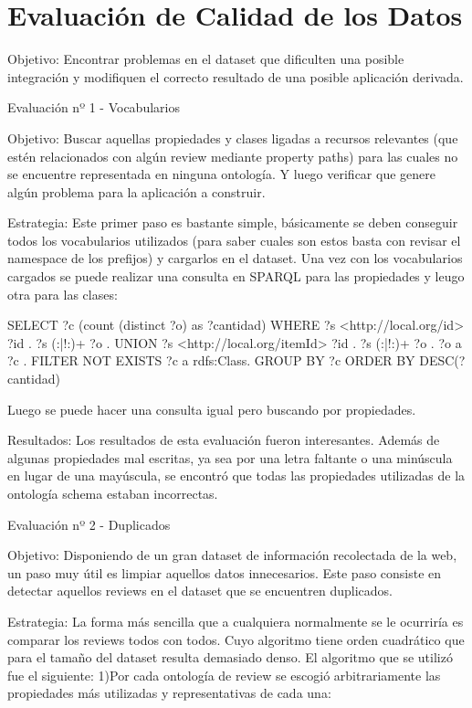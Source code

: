 \chapter{Evaluación de Calidad de los Datos}
\label{chapter:evaluacion}

Objetivo:
Encontrar problemas en el dataset que dificulten una posible integración y modifiquen el correcto resultado de una posible aplicación derivada.

Evaluación nº 1 - Vocabularios

Objetivo:
Buscar aquellas propiedades y clases ligadas a recursos relevantes (que estén relacionados con algún review mediante property paths) 
para las cuales no se encuentre representada en ninguna ontología. Y luego verificar que genere algún problema para la aplicación a construir.

Estrategia:
Este primer paso es bastante simple, básicamente se deben conseguir todos los vocabularios utilizados (para saber cuales son estos basta con revisar el namespace 
de los prefijos) y cargarlos en el dataset.
Una vez con los vocabularios cargados se puede realizar una consulta en SPARQL para las propiedades y leugo otra para las clases:

SELECT ?c (count (distinct ?o) as ?cantidad)
WHERE{
{
?s <http://local.org/id> ?id .
?s (:|!:)+ ?o .
}UNION{
?s <http://local.org/itemId> ?id .
?s (:|!:)+ ?o .
}
?o a ?c .
FILTER NOT EXISTS{
?c a rdfs:Class.
}
}GROUP BY ?c ORDER BY DESC(?cantidad)

Luego se puede hacer una consulta igual pero buscando por propiedades.

Resultados:
Los resultados de esta evaluación fueron interesantes. Además de algunas propiedades mal escritas, ya sea por una letra faltante o una minúscula en lugar 
de una mayúscula, se encontró que todas las propiedades utilizadas de la ontología schema estaban incorrectas.


Evaluación nº 2 - Duplicados

Objetivo:
Disponiendo de un gran dataset de información recolectada de la web, un paso muy útil es limpiar aquellos datos innecesarios. 
Este paso consiste en detectar aquellos reviews en el dataset que se encuentren duplicados.

Estrategia:
La forma más sencilla que a cualquiera normalmente se le ocurriría es comparar los reviews todos con todos. Cuyo algoritmo tiene orden cuadrático que para el tamaño del dataset resulta demasiado denso.
El algoritmo que se utilizó fue el siguiente:
1)Por cada ontología de review se escogió arbitrariamente las propiedades más utilizadas y representativas de cada una:


